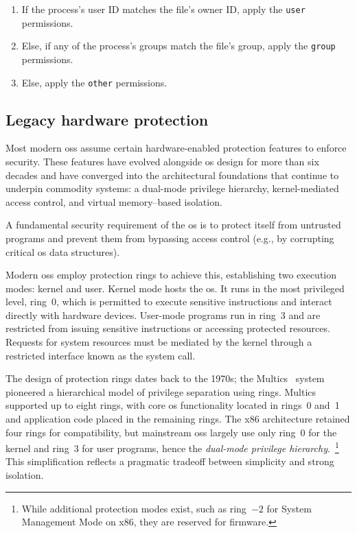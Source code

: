 \begin{enumerate}
	\item If the process's user ID matches the file's owner ID, apply the \texttt{user} permissions.
	\item Else, if any of the process's groups match the file's group, apply the \texttt{group} permissions.
	\item Else, apply the \texttt{other} permissions.
\end{enumerate}


\subsection{Legacy hardware protection}

Most modern \glspl{os} assume certain hardware-enabled protection features to enforce security.
These features have evolved alongside \gls{os} design for more than six decades and have converged into the architectural foundations that continue to underpin commodity systems: a dual-mode privilege hierarchy, kernel-mediated access control, and virtual memory–based isolation.



A fundamental security requirement of the \gls{os} is to protect itself from untrusted programs and prevent them from bypassing access control (e.g., by corrupting critical \gls{os} data structures).

Modern \glspl{os} employ protection rings to achieve this, establishing two execution modes: kernel and user.
Kernel mode hosts the \gls{os}. It runs in the most privileged level, ring~0, which is permitted to execute sensitive instructions and interact directly with hardware devices.
User-mode programs run in ring~3 and are restricted from issuing sensitive instructions or accessing protected resources.
Requests for system resources must be mediated by the kernel through a restricted interface known as the system call.

The design of protection rings dates back to the 1970s; the Multics~\cite{multics} system pioneered a hierarchical model of privilege separation using rings.
Multics supported up to eight rings, with core \gls{os} functionality located in rings~0 and~1 and application code placed in the remaining rings.
The x86 architecture retained four rings for compatibility, but mainstream \glspl{os} largely use only ring~0 for the kernel and ring~3 for user programs, hence the \emph{dual-mode privilege hierarchy}.~\footnote{While additional protection modes exist, such as ring~$-2$ for System Management Mode on x86, they are reserved for firmware.}
This simplification reflects a pragmatic tradeoff between simplicity and strong isolation.


